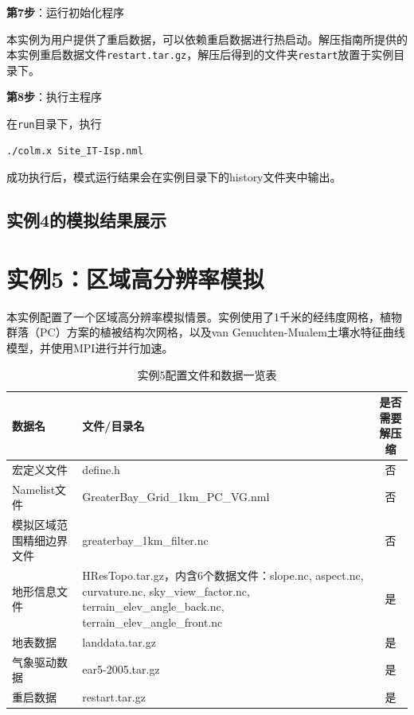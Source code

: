 \bigskip
\textbf{第7步}：运行初始化程序

本实例为用户提供了重启数据，可以依赖重启数据进行热启动。解压指南所提供的本实例重启数据文件\texttt{restart.tar.gz}，解压后得到的文件夹\texttt{restart}放置于实例目录下。

\bigskip
\textbf{第8步}：执行主程序

在\texttt{run}目录下，执行
\begin{lstlisting}[xleftmargin=2.5em]
./colm.x Site_IT-Isp.nml
\end{lstlisting}

成功执行后，模式运行结果会在实例目录下的history文件夹中输出。


\subsection{实例4的模拟结果展示}



\section{实例5：区域高分辨率模拟}

本实例配置了一个区域高分辨率模拟情景。实例使用了1千米的经纬度网格，植物群落（PC）方案的植被结构次网格，以及van Genuchten-Mualem土壤水特征曲线模型，并使用MPI进行并行加速。

\begin{table}[htbp]
\caption{实例5配置文件和数据一览表}
\centering \renewcommand{\arraystretch}{1.5}
\label{ex1table}
\begin{tabular}{lp{}c}
\toprule
\textbf{数据名} & \textbf{文件/目录名} & \textbf{是否需要解压缩} \\\midrule

宏定义文件 & define.h & 否 \\
Namelist文件 & GreaterBay\_Grid\_1km\_PC\_VG.nml & 否 \\
模拟区域范围精细边界文件 & greaterbay\_1km\_filter.nc & 否\\
地形信息文件 & HResTopo.tar.gz，内含6个数据文件：slope.nc, aspect.nc, curvature.nc, sky\_view\_factor.nc, terrain\_elev\_angle\_back.nc, terrain\_elev\_angle\_front.nc & 是 \\
地表数据 & landdata.tar.gz & 是 \\
气象驱动数据 & ear5-2005.tar.gz & 是 \\
重启数据 & restart.tar.gz & 是 \\

\bottomrule
\end{tabular}
\end{table}

